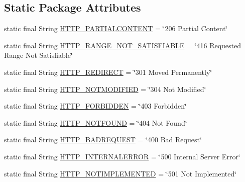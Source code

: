 \subsection*{\-Static \-Package \-Attributes}
\begin{DoxyCompactItemize}
\item 
static final \-String \hyperlink{classcom_1_1axcoto_1_1shinjuku_1_1maki_1_1_nano_h_t_t_p_d_a22a37ecd38591e36f0770a5266d98551}{\-H\-T\-T\-P\-\_\-\-P\-A\-R\-T\-I\-A\-L\-C\-O\-N\-T\-E\-N\-T} = \char`\"{}206 \-Partial \-Content\char`\"{}
\item 
static final \-String \hyperlink{classcom_1_1axcoto_1_1shinjuku_1_1maki_1_1_nano_h_t_t_p_d_a1749afa451731a0df76765b937612b43}{\-H\-T\-T\-P\-\_\-\-R\-A\-N\-G\-E\-\_\-\-N\-O\-T\-\_\-\-S\-A\-T\-I\-S\-F\-I\-A\-B\-L\-E} = \char`\"{}416 \-Requested \-Range \-Not \-Satisfiable\char`\"{}
\item 
static final \-String \hyperlink{classcom_1_1axcoto_1_1shinjuku_1_1maki_1_1_nano_h_t_t_p_d_a3ef371fce0ee742f428b8d915e630402}{\-H\-T\-T\-P\-\_\-\-R\-E\-D\-I\-R\-E\-C\-T} = \char`\"{}301 \-Moved \-Permanently\char`\"{}
\item 
static final \-String \hyperlink{classcom_1_1axcoto_1_1shinjuku_1_1maki_1_1_nano_h_t_t_p_d_afdd02fa32958479220df9ee96ff09d99}{\-H\-T\-T\-P\-\_\-\-N\-O\-T\-M\-O\-D\-I\-F\-I\-E\-D} = \char`\"{}304 \-Not \-Modified\char`\"{}
\item 
static final \-String \hyperlink{classcom_1_1axcoto_1_1shinjuku_1_1maki_1_1_nano_h_t_t_p_d_acc344e3fe188a3e8b18e4af9e826b81b}{\-H\-T\-T\-P\-\_\-\-F\-O\-R\-B\-I\-D\-D\-E\-N} = \char`\"{}403 \-Forbidden\char`\"{}
\item 
static final \-String \hyperlink{classcom_1_1axcoto_1_1shinjuku_1_1maki_1_1_nano_h_t_t_p_d_ad1a2ac40c85a098451ab75a4ebce29fd}{\-H\-T\-T\-P\-\_\-\-N\-O\-T\-F\-O\-U\-N\-D} = \char`\"{}404 \-Not \-Found\char`\"{}
\item 
static final \-String \hyperlink{classcom_1_1axcoto_1_1shinjuku_1_1maki_1_1_nano_h_t_t_p_d_a2991243206c320921502817672865ebb}{\-H\-T\-T\-P\-\_\-\-B\-A\-D\-R\-E\-Q\-U\-E\-S\-T} = \char`\"{}400 \-Bad \-Request\char`\"{}
\item 
static final \-String \hyperlink{classcom_1_1axcoto_1_1shinjuku_1_1maki_1_1_nano_h_t_t_p_d_a9f82e4b07c70ba4c00021e282a37dd94}{\-H\-T\-T\-P\-\_\-\-I\-N\-T\-E\-R\-N\-A\-L\-E\-R\-R\-O\-R} = \char`\"{}500 \-Internal \-Server \-Error\char`\"{}
\item 
static final \-String \hyperlink{classcom_1_1axcoto_1_1shinjuku_1_1maki_1_1_nano_h_t_t_p_d_a599c9dbc7e1c6be41d438a9645464773}{\-H\-T\-T\-P\-\_\-\-N\-O\-T\-I\-M\-P\-L\-E\-M\-E\-N\-T\-E\-D} = \char`\"{}501 \-Not \-Implemented\char`\"{}

\end{DoxyCompactItemize}
